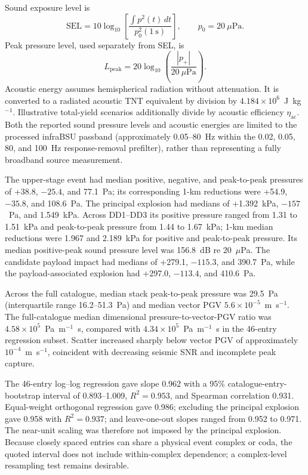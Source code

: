 \documentclass[]{seismica}
\begin{document}
Sound exposure level is
\begin{equation}
 \mathrm{SEL}=10\log_{10}\left[
 \frac{\int p^2(t)\,dt}{p_0^2(1~\mathrm{s})}\right],
 \qquad p_0=20~\mu\mathrm{Pa}.
\end{equation}
Peak pressure level, used separately from SEL, is
\begin{equation}
 L_{\mathrm{peak}}=20\log_{10}\left(\frac{|p_+|}{20~\mu\mathrm{Pa}}\right).
\end{equation}
Acoustic energy assumes hemispherical radiation without attenuation. It is
converted to a radiated acoustic TNT equivalent by division by
$4.184\times10^6$~J~kg$^{-1}$. Illustrative total-yield scenarios additionally
divide by acoustic efficiency $\eta_{\mathrm{ac}}$. Both the reported sound
pressure levels and acoustic energies are limited to the processed infraBSU
passband (approximately 0.05--80~Hz within the 0.02, 0.05, 80, and 100~Hz
response-removal prefilter), rather than representing a fully broadband source
measurement.

The upper-stage event had median positive, negative, and peak-to-peak
pressures of +38.8, $-25.4$, and 77.1~Pa; its corresponding 1-km reductions
were +54.9, $-35.8$, and 108.6~Pa. The principal explosion had medians of
+1.392~kPa, $-157$~Pa, and 1.549~kPa. Across DD1--DD3 its positive pressure
ranged from 1.31 to 1.51~kPa and peak-to-peak pressure from 1.44 to 1.67~kPa;
1-km median reductions were 1.967 and 2.189~kPa for positive and peak-to-peak
pressure. Its median positive-peak sound pressure level was 156.8~dB re
20~$\mu$Pa. The candidate payload impact had medians of +279.1, $-115.3$, and
390.7~Pa, while the payload-associated explosion had +297.0, $-113.4$, and
410.6~Pa.

Across the full catalogue, median stack peak-to-peak pressure was 29.5~Pa
(interquartile range 16.2--51.3~Pa) and median vector PGV
$5.6\times10^{-5}$~m~s$^{-1}$. The full-catalogue median dimensional
pressure-to-vector-PGV ratio was
$4.58\times10^5$~Pa~m$^{-1}$~s, compared with
$4.34\times10^5$~Pa~m$^{-1}$~s in the 46-entry regression subset. Scatter
increased sharply below vector PGV of approximately $10^{-4}$~m~s$^{-1}$,
coincident with decreasing seismic SNR and incomplete peak capture.

The 46-entry log--log regression gave slope 0.962 with a 95\%
catalogue-entry-bootstrap
interval of 0.893--1.009, $R^2=0.953$, and Spearman correlation 0.931.
Equal-weight orthogonal regression gave 0.986; excluding the principal
explosion gave 0.958 with $R^2=0.937$; and leave-one-out slopes ranged from
0.952 to 0.971. The near-unit scaling was therefore not imposed by the
principal explosion. Because closely spaced entries can share a physical event
complex or coda, the quoted interval does not include within-complex
dependence; a complex-level resampling test remains desirable.
\end{document}
